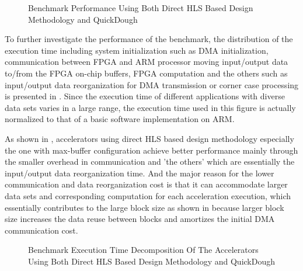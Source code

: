 \begin{figure}[htpb]
\caption{Benchmark Performance Using Both Direct HLS Based Design Methodology and QuickDough}
\label{fig:real-perf}
\end{figure}

To further investigate the performance of the benchmark, the distribution of the execution time including system initialization such as DMA initialization, communication between FPGA and ARM processor moving input/output data to/from the FPGA on-chip buffers, FPGA computation and the others such as input/output data reorganization for DMA transmission or corner case processing is presented in . Since the execution time of different applications with diverse data sets varies in a large range, the execution time used in this figure is actually normalized to that of a basic software implementation on ARM. 

As shown in , accelerators using direct HLS based design methodology especially the one with max-buffer configuration achieve better performance mainly through the smaller overhead in communication and 'the others' which are essentially the input/output data reorganization time. And the major reason for the lower communication and data reorganization cost is that it can accommodate larger data sets and corresponding computation for each acceleration execution, which essentially contributes to the large block size as shown in  because larger block size increases the data reuse between blocks and amortizes the initial DMA communication cost.

\begin{figure}[htpb]
\caption{Benchmark Execution Time Decomposition Of The Accelerators Using Both Direct HLS Based Design Methodology and QuickDough}
\label{fig:execution-time}
\end{figure}

